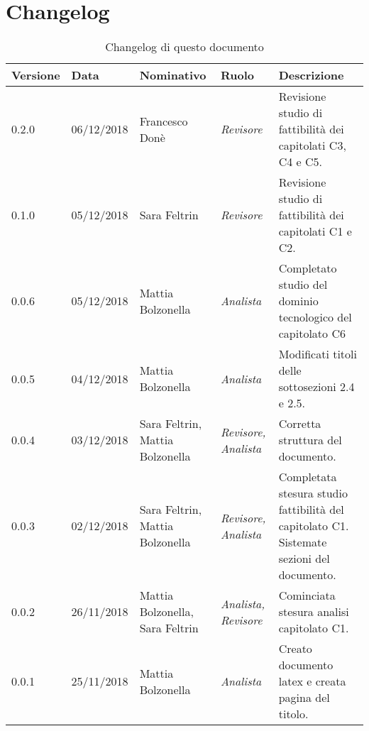 \section{Changelog}
\begin{table}[tbph]
        \centering
        \begin{tabularx}{\textwidth}{|l|l|l|l|X|}
                \hline
                \textbf{Versione} & \textbf{Data} & \textbf{Nominativo}  & \textbf{Ruolo} & 
                \textbf{Descrizione}\\
                \hline \hline
              	0.2.0 & 06/12/2018 & Francesco Donè & \textit{Revisore} & 
              	Revisione studio di fattibilità dei capitolati C3, C4 e C5.\\
                
                \hline
                0.1.0 & 05/12/2018 & Sara Feltrin & \textit{Revisore} & 
                Revisione studio di fattibilità dei capitolati C1 e C2.\\
              
                \hline
                0.0.6 & 05/12/2018 & Mattia Bolzonella & \textit{Analista} & 
                Completato studio del dominio tecnologico del capitolato C6\\
                
                \hline
                0.0.5 & 04/12/2018 & Mattia Bolzonella & \textit{Analista} & 
                Modificati titoli delle sottosezioni 2.4 e 2.5. \\
                
                \hline
                0.0.4 & 03/12/2018 & Sara Feltrin, Mattia Bolzonella 
                & \textit{Revisore, Analista} & Corretta struttura del documento. \\
                
                \hline
                0.0.3 & 02/12/2018 & Sara Feltrin, Mattia Bolzonella & \textit{Revisore, Analista}
                & Completata stesura studio fattibilità del capitolato C1.
                Sistemate sezioni del documento. \\
                
                \hline
                0.0.2 & 26/11/2018 & Mattia Bolzonella, Sara Feltrin & \textit{Analista, Revisore}
                & Cominciata stesura analisi capitolato C1.\\

                \hline
                0.0.1 & 25/11/2018 & Mattia Bolzonella & \textit{Analista}
                & Creato documento latex e creata pagina del titolo.\\
                
                \hline
                
        \end{tabularx}
        \caption{Changelog di questo documento}
\end{table}
